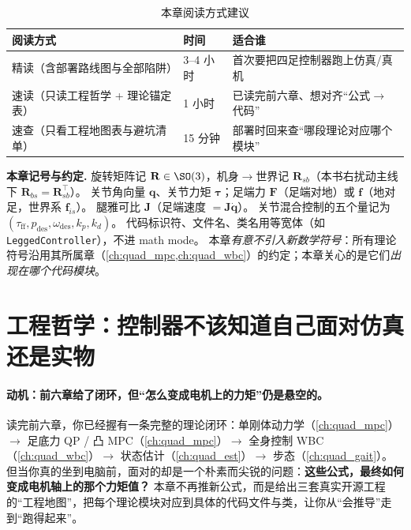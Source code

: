 \begin{table}[H]\centering\small
\caption{本章阅读方式建议}
\begin{tabular}{lll}
\toprule
阅读方式 & 时间 & 适合谁 \\
\midrule
精读（含部署路线图与全部陷阱） & 3--4 小时 & 首次要把四足控制器跑上仿真/真机 \\
速读（只读工程哲学 + 理论锚定表） & 1 小时 & 已读完前六章、想对齐“公式$\to$代码” \\
速查（只看工程地图表与避坑清单） & 15 分钟 & 部署时回来查“哪段理论对应哪个模块” \\
\bottomrule
\end{tabular}
\end{table}

\begin{note}
\textbf{本章记号与约定.}\;
旋转矩阵记 $\mathbf{R}\in\SO(3)$，机身$\to$世界记 $\mathbf{R}_{sb}$（本书右扰动主线下 $\mathbf{R}_{bs}=\mathbf{R}_{sb}^\top$）。
关节角向量 $\boldsymbol{q}$、关节力矩 $\boldsymbol{\tau}$；足端力 $\boldsymbol{F}$（足端对地）或 $\boldsymbol{f}$（地对足，世界系 $\boldsymbol{f}_{is}$）。
腿雅可比 $\mathbf{J}$（足端速度 $=\mathbf{J}\dot{\boldsymbol{q}}$）。
关节混合控制的五个量记为 $(\tau_{\mathrm{ff}},p_{\mathrm{des}},\omega_{\mathrm{des}},k_p,k_d)$。
代码标识符、文件名、类名用等宽体（如 \texttt{LeggedController}），不进 math mode。
本章\emph{有意不引入新数学符号}：所有理论符号沿用其所属章（\cref{ch:quad_mpc,ch:quad_wbc}）的约定；本章关心的是它们\emph{出现在哪个代码模块}。
\end{note}

\section{工程哲学：控制器不该知道自己面对仿真还是实物}
\label{sec:qp-philosophy}

\paragraph{动机：前六章给了闭环，但“怎么变成电机上的力矩”仍是悬空的。}
读完前六章，你已经握有一条完整的理论闭环：单刚体动力学（\cref{ch:quad_mpc}）$\to$ 足底力 QP / 凸 MPC（\cref{ch:quad_mpc}）$\to$ 全身控制 WBC（\cref{ch:quad_wbc}）$\to$ 状态估计（\cref{ch:quad_est}）$\to$ 步态（\cref{ch:quad_gait}）。但当你真的坐到电脑前，面对的却是一个朴素而尖锐的问题：\textbf{这些公式，最终如何变成电机轴上的那个力矩值？} 本章不再推新公式，而是给出三套真实开源工程的“工程地图”，把每个理论模块对应到具体的代码文件与类，让你从“会推导”走到“跑得起来”。

